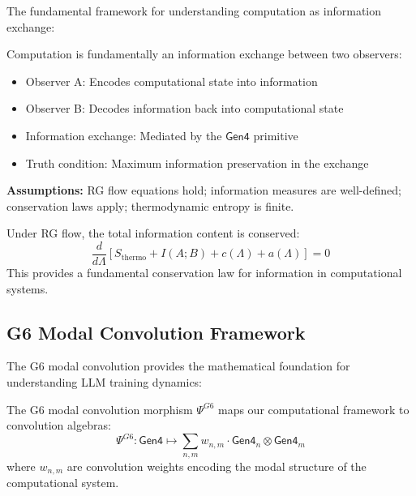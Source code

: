 The fundamental framework for understanding computation as information exchange:

\begin{definition}
\label{def:two-observer-model}
Computation is fundamentally an information exchange between two observers:
\begin{itemize}
\item Observer A: Encodes computational state into information
\item Observer B: Decodes information back into computational state
\item Information exchange: Mediated by the $\mathsf{Gen4}$ primitive
\item Truth condition: Maximum information preservation in the exchange
\end{itemize}
\end{definition}

\begin{notation}[Hypotheses]
\label{not:hypotheses-info}
\textbf{Assumptions:} RG flow equations hold; information measures are well-defined; conservation laws apply; thermodynamic entropy is finite.
\end{notation}

\begin{theorem}
\label{thm:info-flow-conservation}
Under RG flow, the total information content is conserved:
\[
\frac{d}{d\Lambda} \left[ S_{\text{thermo}} + I(A;B) + c(\Lambda) + a(\Lambda) \right] = 0
\]
This provides a fundamental conservation law for information in computational systems.
\end{theorem}

\subsection{G6 Modal Convolution Framework}

The G6 modal convolution provides the mathematical foundation for understanding LLM training dynamics:

\begin{definition}
\label{def:g6-convolution}
The G6 modal convolution morphism $\Psi^{G6}$ maps our computational framework to convolution algebras:
\[
\Psi^{G6}: \mathsf{Gen4} \mapsto \sum_{n,m} w_{n,m} \cdot \mathsf{Gen4}_n \otimes \mathsf{Gen4}_m
\]
where $w_{n,m}$ are convolution weights encoding the modal structure of the computational system.
\end{definition}

